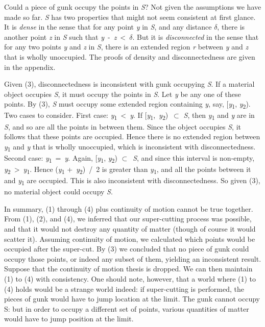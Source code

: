 \documentclass[
  10pt,
  letterpaper,
  DIV=11,
  numbers=noendperiod,
  twoside]{scrartcl}
\begin{document}
Could a piece of gunk occupy the points in \emph{S}? Not given the
assumptions we have made so far. \emph{S} has two properties that might
not seem consistent at first glance. It is \emph{dense} in the sense
that for any point \emph{y} in \emph{S}, and any distance \({\delta}\),
there is another point \emph{z} in \emph{S} such that
\emph{y}~-~\emph{z}~\textless~\({\delta}\). But it is
\emph{disconnected} in the sense that for any two points \emph{y} and
\emph{z} in \emph{S}, there is an extended region \emph{r} between
\emph{y} and \emph{z} that is wholly unoccupied. The proofs of density
and disconnectedness are given in the appendix.

Given (3), disconnectedness is inconsistent with gunk occupying
\emph{S}. If a material object occupies \emph{S}, it must occupy the
points in \emph{S}. Let \emph{y} be any one of these points. By (3),
\emph{S} must occupy some extended region containing \emph{y}, say,
{[}\emph{y}\textsubscript{1}, \emph{y}\textsubscript{2}). Two cases to
consider. First case: \emph{y}\textsubscript{1}~\textless~\emph{y}. If
{[}\emph{y}\textsubscript{1},~\emph{y}\textsubscript{2})~\({\subset}\)
\emph{S}, then \emph{y}\textsubscript{1} and \emph{y} are in \emph{S},
and so are all the points in between them. Since the object occupies
\emph{S}, it follows that these points are occupied. Hence there is no
extended region between \emph{y}\textsubscript{1} and \emph{y} that is
wholly unoccupied, which is inconsistent with disconnectedness. Second
case: \emph{y}\textsubscript{1}~=~\emph{y}. Again,
{[}\emph{y}\textsubscript{1}, \emph{y}\textsubscript{2})
\({\subset}\)~\emph{S}, and since this interval is non-empty,
\emph{y}\textsubscript{2}~\textgreater~\emph{y}\textsubscript{1}. Hence
(\emph{y}\textsubscript{1} +~\emph{y}\textsubscript{2})~/~2 is greater
than \emph{y}\textsubscript{1}, and all the points between it and
\emph{y}\textsubscript{1} are occupied. This is also inconsistent with
disconnectedness. So given (3), no material object could occupy
\emph{S}.

In summary, (1) through (4) plus continuity of motion cannot be true
together. From (1), (2), and (4), we inferred that our super-cutting
process was possible, and that it would not destroy any quantity of
matter (though of course it would scatter it). Assuming continuity of
motion, we calculated which points would be occupied after the
super-cut. By (3) we concluded that no piece of gunk could occupy those
points, or indeed any subset of them, yielding an inconsistent result.
Suppose that the continuity of motion thesis is dropped. We can then
maintain (1) to (4) with consistency. One should note, however, that a
world where (1) to (4) holds would be a strange world indeed: if
super-cutting is performed, the pieces of gunk would have to jump
location at the limit. The gunk cannot occupy S: but in order to occupy
a different set of points, various quantities of matter would have to
jump position at the limit.
\end{document}
